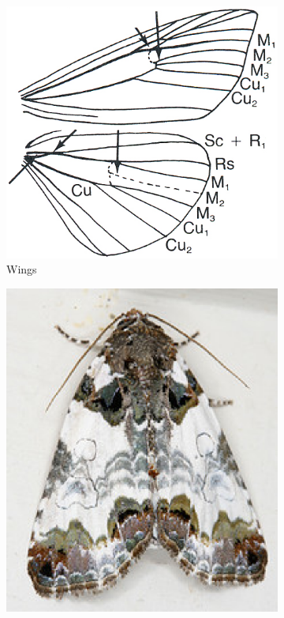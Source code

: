\documentclass[letterpaper, 11pt]{article}
\begin{document}
\begin{figure}[ht!]
    \centering
    \begin{subfigure}[ht!]{0.37\textwidth}
        \includegraphics[width=\textwidth]{image08}
        \caption{Wings}
        \label{fig:noctuid1}
    \end{subfigure}
    \qquad %
    \begin{subfigure}[ht!]{0.37\textwidth}
        \includegraphics[width=\textwidth]{image07}

\end{subfigure}
\end{figure}
\end{document}
